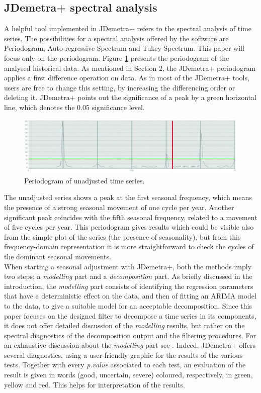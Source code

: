\documentclass[english,blauw]{cbsdiscussionpaper}
\begin{document}
\subsection{JDemetra+ spectral analysis}
A helpful tool implemented in JDemetra+ refers to the spectral analysis of time series. The possibilities for a spectral analysis offered by the software are Periodogram, Auto-regressive Spectrum and Tukey Spectrum. This paper will focus only on the periodogram. Figure \ref{fig:amsper} presents the periodogram of the analysed historical data. As mentioned in Section 2, the JDemetra+ periodogram applies a first difference operation on data. As in most of the JDemetra+ tools, users are free to change this setting, by increasing the differencing order or deleting it. JDemetra+ points out the significance of a peak by a green horizontal line, which denotes the 0.05 significance level.
\begin{figure}[h]
\includegraphics[width=\linewidth]{../images/capitolo3/amsper.jpg}
\caption{Periodogram of unadjusted time series.}
\label{fig:amsper}
\end{figure}
The unadjusted series shows a peak at the first seasonal frequency, which means the presence of a strong seasonal movement of one cycle per year. Another significant peak coincides with the fifth seasonal frequency, related to a movement of five cycles per year. This periodogram gives results which could be visible also from the simple plot of the series (the presence of seasonality), but from this frequency-domain representation it is more straightforward to check the cycles of the dominant seasonal movements.\\When starting a seasonal adjustment with JDemetra+, both the methods imply two steps; a \textit{modelling} part and a \textit{decomposition} part. As briefly discussed in the introduction, the \textit{modelling} part consists of identifying the regression parameters that have a deterministic effect on the data, and then of fitting an ARIMA model to the data, to give a suitable model for an acceptable decomposition. Since this paper focuses on the designed filter to decompose a time series in its components, it does not offer detailed discussion of the \textit{modelling} results, but rather on the spectral diagnostics of the decomposition output and the filtering procedures. For an exhaustive discussion about the \textit{modelling} part see \citep{tramo2008}. Indeed, JDemetra+ offers several diagnostics, using a user-friendly graphic for the results of the various tests. Together with every \textit{p.value} associated to each test, an evaluation of the result is given in words (good, uncertain, severe) coloured, respectively, in green, yellow and red. This helps for interpretation of the results.\\
\end{document}
